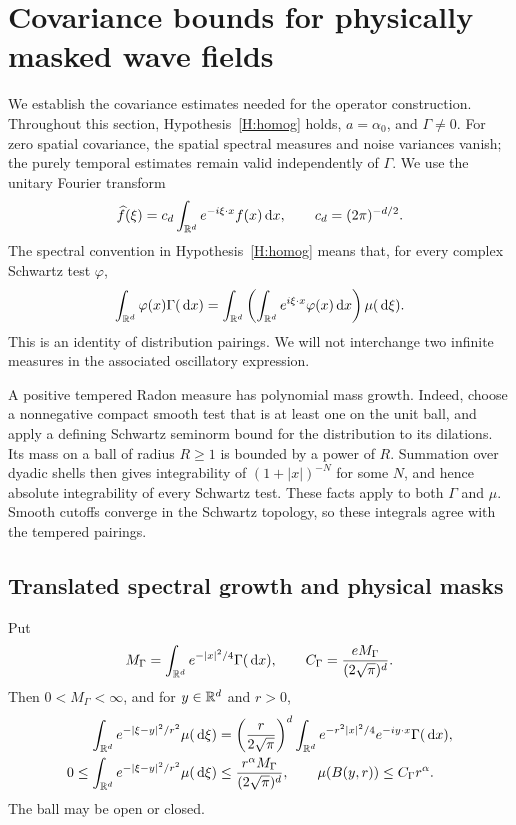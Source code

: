 \section{Covariance bounds for physically masked wave fields}
\label{S:masked-covariance}



We establish the covariance estimates needed for the operator construction.
Throughout this section, Hypothesis~\ref{H:homog} holds, $a = \alpha_0$, and
$\Gamma \ne 0$. For zero spatial covariance, the spatial spectral measures and
noise variances vanish; the purely temporal estimates remain valid independently
of $\Gamma$. We use the unitary Fourier transform
\[
  \widehat{f}(\xi) = c_d\int_{\mathbb{R}^d}e^{-i\xi\cdot x}f(x)\,\mathrm{d} x,
  \qquad c_d = (2\pi)^{-d/2}.
\]
The spectral convention in Hypothesis~\ref{H:homog} means that, for every
complex Schwartz test $\varphi$,
\begin{equation}\label{E:masked-spectral-convention}
  \int_{\mathbb{R}^d}\varphi(x)\Gamma(\,\mathrm{d} x)
  = \int_{\mathbb{R}^d}\left(\int_{\mathbb{R}^d}e^{i\xi\cdot x}
  \varphi(x)\,\mathrm{d} x\right)\mu(\,\mathrm{d}\xi).
\end{equation}
This is an identity of distribution pairings. We will not interchange two
infinite measures in the associated oscillatory expression.

A positive tempered Radon measure has polynomial mass growth. Indeed, choose a
nonnegative compact smooth test that is at least one on the unit ball, and apply
a defining Schwartz seminorm bound for the distribution to its dilations. Its
mass on a ball of radius $R \ge 1$ is bounded by a power of $R$. Summation over
dyadic shells then gives integrability of $(1+|x|)^{-N}$ for some $N$, and hence
absolute integrability of every Schwartz test. These facts apply to both
$\Gamma$ and $\mu$. Smooth cutoffs converge in the Schwartz topology, so these
integrals agree with the tempered pairings.

\subsection{Translated spectral growth and physical masks}

\begin{proposition}\label{P:masked-spectral-growth}
  Put
  \[
    M_\Gamma = \int_{\mathbb{R}^d}e^{-|x|^2/4}\Gamma(\,\mathrm{d} x),
    \qquad C_\Gamma = \frac{eM_\Gamma}{(2\sqrt{\pi})^d}.
  \]
  Then $0 < M_\Gamma < \infty$, and for $y \in \mathbb{R}^d$ and $r > 0$,
  \begin{align}
    \int_{\mathbb{R}^d}e^{-|\xi-y|^2/r^2}\mu(\,\mathrm{d}\xi)
    &= \left(\frac{r}{2\sqrt{\pi}}\right)^d
    \int_{\mathbb{R}^d}e^{-r^2|x|^2/4}e^{-iy\cdot x}\Gamma(\,\mathrm{d} x),
    \label{E:masked-gaussian-transform}\\
    0 \le \int_{\mathbb{R}^d}e^{-|\xi-y|^2/r^2}\mu(\,\mathrm{d}\xi)
    &\le \frac{r^\alpha M_\Gamma}{(2\sqrt{\pi})^d},
    \qquad \mu(B(y,r)) \le C_\Gamma r^\alpha.
    \label{E:masked-translated-ball}
  \end{align}
  The ball may be open or closed.
\end{proposition}


